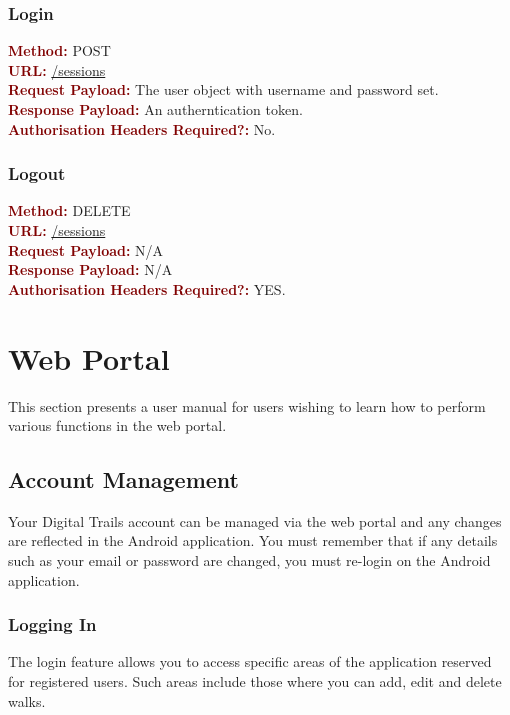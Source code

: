 \documentclass[11pt,a4paper]{report}
\begin{document}
\subsubsection{Login}
\textbf{\textcolor{Maroon}{Method:}} POST\\
\textbf{\textcolor{Maroon}{URL:}} \url{/sessions}\\
\textbf{\textcolor{Maroon}{Request Payload:}} The user object with username and password set.\\
\textbf{\textcolor{Maroon}{Response Payload:}} An autherntication token.\\
\textbf{\textcolor{Maroon}{Authorisation Headers Required?:}} No.

\subsubsection{Logout}
\textbf{\textcolor{Maroon}{Method:}} DELETE\\
\textbf{\textcolor{Maroon}{URL:}} \url{/sessions}\\
\textbf{\textcolor{Maroon}{Request Payload:}} N/A\\
\textbf{\textcolor{Maroon}{Response Payload:}} N/A\\
\textbf{\textcolor{Maroon}{Authorisation Headers Required?:}} YES.


\section{Web Portal}

This section presents a user manual for users wishing to learn how to perform various functions in the web portal.

\subsection{Account Management}

Your Digital Trails account can be managed via the web portal and any changes are reflected in the Android application. You must remember that if any details such as your email or password are changed, you must re-login on the Android application.

\subsubsection{Logging In}

The login feature allows you to access specific areas of the application reserved for registered users. Such areas include those where you can add, edit and delete walks.
\end{document}
